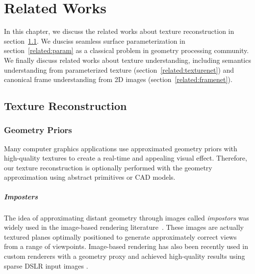 \chapter{Related Works}
\label{chapter:related}
In this chapter, we discuss the related works about texture reconstruction in section~\ref{related:texture-recon}. We dusciss seamless surface parameterization in section~\ref{related:param} as a classical problem in geometry processing community. We finally discuss related works about texture understanding,  including semantics understanding from parameterized texture (section~\ref{related:texturenet}) and canonical frame understanding from 2D images (section~\ref{related:framenet}).

\section{Texture Reconstruction}
\label{related:texture-recon}

\subsection{Geometry Priors}
Many computer graphics applications use approximated geometry priors with high-quality textures to create a real-time and appealing visual effect. Therefore, our texture reconstruction is optionally performed with the geometry approximation using abstract primitives or CAD models.

\paragraph*{Imposters} The idea of approximating distant geometry through images called {\em impostors} was widely used in the image-based rendering literature~\cite{sillion1997efficient,decoret1999multi}. 
These images are actually textured planes optimally positioned to generate approximately correct views from a range of viewpoints.
Image-based rendering has also been recently used in custom renderers with a geometry proxy and achieved high-quality results using sparse DSLR input images \cite{hedman2016scalable}.

